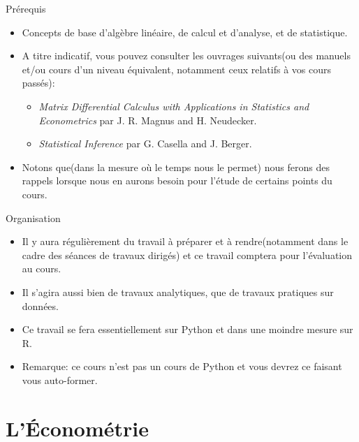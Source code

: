 \begin{frame}[allowframebreaks]{Prérequis}
\begin{itemize}
\item Concepts de base d'algèbre linéaire, de calcul et d'analyse, et de statistique.

\item  A titre indicatif, vous pouvez consulter les ouvrages suivants(ou des
 manuels et/ou cours d'un niveau équivalent, notamment ceux relatifs à vos
 cours passés):
\begin{itemize}
\item \emph{Matrix Differential Calculus with Applications in Statistics and Econometrics} par J. R. Magnus and H. Neudecker.
\item \emph{Statistical Inference} par  G. Casella and J. Berger.
\end{itemize}

\item Notons que(dans la mesure où le temps nous le permet) nous ferons des
rappels lorsque nous en aurons besoin pour l'étude de certains points
du cours.
\end{itemize}
\end{frame}

\begin{frame}[allowframebreaks]{Organisation}
\begin{itemize}
\item Il y aura régulièrement du travail à préparer et à rendre(notamment
dans le cadre des séances de travaux dirigés) et ce travail comptera
pour l'évaluation au cours. 

\item Il s'agira aussi bien de travaux
analytiques, que de travaux pratiques sur données. 

\item Ce travail se fera essentiellement sur Python et dans
  une moindre mesure sur R.

\item \alert{Remarque:} ce cours n'est pas un cours de Python et vous
  devrez ce faisant vous auto-former.
\end{itemize}

\end{frame}


\section{L'\'Econométrie}
\frame{\sectionpage}

